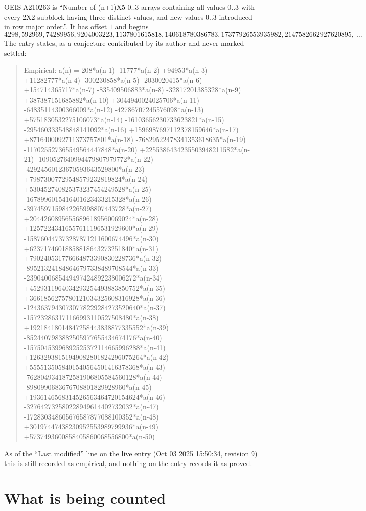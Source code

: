\documentclass[11pt,a4paper]{article}
\theoremstyle{plain}
\theoremstyle{definition}
\begin{document}
OEIS A210263 is ``Number of (n+1)X5 0..3 arrays containing all values 0..3 with every 2X2 subblock having three distinct values, and new values 0..3 introduced in row major order.''. It has offset $1$ and begins
\[
4298, 592969, 74289956, 9204003223, 1137801615818, 140618780386783, 17377926553935982, 2147582662927620895,\ \dots
\]
The entry states, as a conjecture contributed by its author and never marked settled:
\begin{quote}
Empirical: a(n) = 208*a(n-1) -11777*a(n-2) +94953*a(n-3) +11282777*a(n-4) -300230858*a(n-5) -2030020415*a(n-6) +154714365717*a(n-7) -835409506883*a(n-8) -32817201385328*a(n-9) +387387151685882*a(n-10) +3044940024025706*a(n-11) -64835114300366009*a(n-12) -42786707245576098*a(n-13) +5751830532275106073*a(n-14) -16103656230733623821*a(n-15) -295460333548848141092*a(n-16) +1596987697112378159646*a(n-17) +8716400092711373757801*a(n-18) -76829522478341353618635*a(n-19) -117025527365549564447848*a(n-20) +2255386434235503948211582*a(n-21) -1090527640994479807979772*a(n-22) -42924560123670593643529800*a(n-23) +79873007729548579232819824*a(n-24) +530452740825373237454249528*a(n-25) -1678996015416401623433215328*a(n-26) -3974597159842265998807443728*a(n-27) +20442608956556896189560069024*a(n-28) +12572243416557611196531929600*a(n-29) -158760447373287871211600674496*a(n-30) +62371746018858818643273251840*a(n-31) +790240531776664873390830228736*a(n-32) -895213241848646797338489708544*a(n-33) -2390400685449497424892238006272*a(n-34) +4529311964034293254493883850752*a(n-35) +3661856275780121034325608316928*a(n-36) -12436379430730778229284273520640*a(n-37) -157232863171166993110527508480*a(n-38) +19218418014847258443838877335552*a(n-39) -8524407983882505977655434674176*a(n-40) -15750453996892525372114665996288*a(n-41) +12632938151949082801824296075264*a(n-42) +5555135058401540564501416378368*a(n-43) -7628049341872581906805584560128*a(n-44) -8980990683676708801829928960*a(n-45) +1936146568314526563464720154624*a(n-46) -327642732580228949614402732032*a(n-47) -172830348605676587877088100352*a(n-48) +30197447438230952553989799936*a(n-49) +5737493600858405860068556800*a(n-50)
\end{quote}
As of the ``Last modified'' line on the live entry (Oct 03 2025 15:50:34, revision 9) this is still
recorded as empirical, and nothing on the entry records it as proved.

\section{What is being counted}
\end{document}

